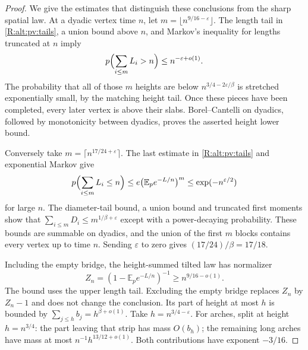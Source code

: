 \begin{proof}
We give the estimates that distinguish these conclusions from the sharp
spatial law.  At a dyadic vertex time $n$, let
$m=\lfloor n^{9/16-\varepsilon}\rfloor$.
The length tail in \eqref{R:alt:pv:tails}, a union bound above $n$, and
Markov's inequality for lengths truncated at $n$ imply
\[
 p\Bigl(\sum_{i\le m}L_i>n\Bigr)\le n^{-\varepsilon+o(1)}.
\]
The probability that all of those $m$ heights are below
$n^{3/4-2\varepsilon/\beta}$ is stretched exponentially small, by the
matching height tail.  Once these pieces have been completed, every later
vertex is above their slabs.  Borel--Cantelli on dyadics, followed by
monotonicity between dyadics, proves the asserted height lower bound.

Conversely take $m=\lceil n^{17/24+\varepsilon}\rceil$.
The last estimate in \eqref{R:alt:pv:tails} and exponential Markov give
\[
 p\Bigl(\sum_{i\le m}L_i\le n\Bigr)
 \le e\bigl(\mathbb E_p e^{-L/n}\bigr)^m
 \le \exp(-n^{\varepsilon/2})
\]
for large $n$.  The diameter-tail bound, a union bound and truncated first
moments show that $\sum_{i\le m}D_i\le m^{1/\beta+\varepsilon}$ except
with a power-decaying probability.  These bounds are summable on dyadics,
and the union of the first $m$ blocks contains every vertex up to time $n$.
Sending $\varepsilon$ to zero gives $(17/24)/\beta=17/18$.

Including the empty bridge, the height-summed tilted law has normalizer
\[
 Z_n=(1-\mathbb E_pe^{-L/n})^{-1}\ge n^{9/16-o(1)}.
\]
The bound uses the upper length tail.  Excluding the empty bridge replaces $Z_n$
by $Z_n-1$ and does not change the conclusion.  Its part of height at most $h$ is bounded by
$\sum_{j\le h}b_j=h^{\beta+o(1)}$.
Take $h=n^{3/4-\varepsilon}$.  For arches, split at height
$h=n^{3/4}$: the part leaving that strip has mass $O(b_h)$;
the remaining long arches have mass at most
$n^{-1}h^{13/12+o(1)}$.  Both contributions have exponent $-3/16$.


\end{proof}
